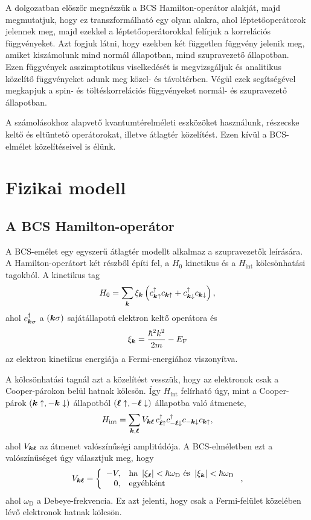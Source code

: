 \documentclass[a4paper,12pt,titlepage]{article}
\newcommand{\KK}{{\vb*{k}}}
\newcommand{\LL}{{\vb*{\ell}}}
\newcommand{\EF}{{E_\text{F}}}
\begin{document}
A dolgozatban először megnézzük a BCS Hamilton-operátor alakját, majd megmutatjuk, hogy ez transzformálható egy olyan alakra, ahol léptetőoperátorok jelennek meg, majd ezekkel a léptetőoperátorokkal felírjuk a korrelációs függvényeket.  Azt fogjuk látni, hogy ezekben két független függvény jelenik meg, amiket kiszámolunk mind normál állapotban, mind szupravezető állapotban.  Ezen függvények asszimptotikus viselkedését is megvizsgáljuk és analitikus közelítő függvényeket adunk meg közel- és távoltérben.  Végül ezek segítségével megkapjuk a spin- és töltéskorrelációs függvényeket normál- és szupravezető állapotban.

A számolásokhoz alapvető kvantumtérelméleti eszközöket használunk, részecske keltő és eltüntető operátorokat, illetve átlagtér közelítést.  Ezen kívül a BCS-elmélet közelítéseivel is élünk.



\section{Fizikai modell}

\subsection{A BCS Hamilton-operátor}

A BCS-emélet egy egyszerű átlagtér modellt alkalmaz a szupravezetők leírására.  A Hamilton-operátort két részből építi fel, a $H_0$ kinetikus és a $H_\text{int}$ kölcsönhatási tagokból.  A kinetikus tag
\begin{equation}
	H_0 = \sum\limits_\KK \xi_\KK \left( c_{\KK \uparrow}^\dagger c_{\KK \uparrow} + c_{\KK \downarrow}^\dagger c_{\KK \downarrow} \right),
\end{equation}
ahol $c_{\KK \sigma}^\dagger$ a $\left( \KK \sigma \right)$ sajátállapotú elektron keltő operátora és
$$ \xi_\KK = \frac{\hbar^2 k^2}{2 m} - \EF $$
az elektron kinetikus energiája a Fermi-energiához viszonyítva.

A kölcsönhatási tagnál azt a közelítést vesszük, hogy az elektronok csak a Cooper-párokon belül hatnak kölcsön.  Így $H_\text{int}$ felírható úgy, mint a Cooper-párok $\left( \KK \uparrow, -\KK \downarrow \right)$ állapotból $\left( \LL \uparrow, -\LL \downarrow \right)$ állapotba való átmenete,
\begin{equation} \label{H-int-def}
	H_\text{int} = \sum\limits_{\KK, \LL} V_{\KK \LL} \, c_{\LL \uparrow}^\dagger c_{-\LL \downarrow}^\dagger c_{-\KK \downarrow} c_{\KK \uparrow},
\end{equation}
ahol $V_{\KK \LL}$ az átmenet valószínűségi amplitúdója.  A BCS-elméletben ezt a valószínűséget úgy választjuk meg, hogy
$$ V_{\KK \LL} = \left\{ \begin{array}{rl}
	-V, & \text{ha } \left| \xi_\LL \right| < \hbar \omega_\text{D} \text{ és } \left| \xi_\KK \right| < \hbar \omega_\text{D} \\
	0, & \text{egyébként}
\end{array} \right. , $$
ahol $\omega_\text{D}$ a Debeye-frekvencia.  Ez azt jelenti, hogy csak a Fermi-felület közelében lévő elektronok hatnak kölcsön.
\end{document}

